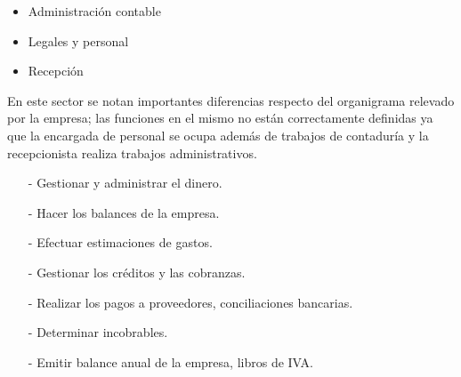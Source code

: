 \documentclass[a4paper,10pt,titlepage]{article}
\begin{document}
 \begin{itemize}
   \item Administraci\'on contable
   \item Legales y personal
   \item Recepci\'on
 \end{itemize}
 En este sector se notan importantes diferencias respecto del organigrama relevado por la empresa; las funciones en el mismo no est\'an correctamente definidas ya que la encargada de personal se ocupa adem\'as de trabajos de contaduría y la recepcionista realiza trabajos administrativos.
 \bigskip
 \bigskip
 {
    \begin{itemize}
        \item[-] Gestionar y administrar el dinero.
        \item[-] Hacer los balances de la empresa.
        \item[-] Efectuar estimaciones de gastos.
    \end{itemize}
 }
 {
    \begin{itemize}
        \item[-] Gestionar los cr\'editos y las cobranzas.
        \item[-] Realizar los pagos a proveedores, conciliaciones bancarias.
    \end{itemize}
 }
 {
    \begin{itemize}
         \item[-] Determinar incobrables.
         \item[-] Emitir balance anual de la empresa, libros de IVA.
    \end{itemize}
 }
 

\newpage
\end{document}
